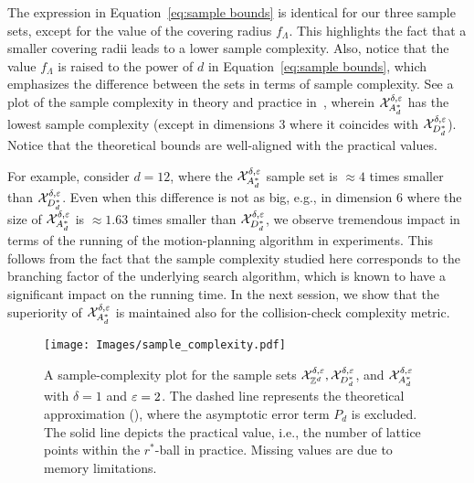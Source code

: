 The expression in Equation~\eqref{eq:sample bounds} is identical for our three sample sets, except for the value of the covering radius $f_\Lambda$. This highlights the fact that a smaller covering radii leads to a lower sample complexity. Also, notice that the value $f_\Lambda$ is raised to the power of $d$ in Equation~\eqref{eq:sample bounds}, which emphasizes the difference between the sets in terms of sample complexity. 
See a plot of the sample complexity in theory and practice in~, wherein $\mathcal{X}_{A_d^*}^{\delta,\varepsilon}$ has the lowest sample complexity (except in dimensions $3$ where it coincides with $\mathcal{X}_{D_d^*}^{\delta,\varepsilon}$). Notice that the theoretical bounds are well-aligned with the practical values. 

For example, consider $d=12$, where the $\mathcal{X}_{A_d^*}^{\delta,\varepsilon}$ sample set is  $\approx 4$ times smaller than $\mathcal{X}_{D_d^*}^{\delta,\varepsilon}$.  Even when this difference is not as big, e.g., in dimension $6$ where the size of $\mathcal{X}_{A_d^*}^{\delta,\varepsilon}$ is  $\approx 1.63$ times smaller than $\mathcal{X}_{D_d^*}^{\delta,\varepsilon}$, we observe tremendous impact in terms of the running of the motion-planning algorithm in experiments. This follows from the fact that the sample complexity studied here corresponds to the branching factor of the underlying search algorithm, which is known to have a significant impact on the running time. In the next session, we show that the superiority of $\mathcal{X}_{A_d^*}^{\delta,\varepsilon}$ is maintained also for the collision-check complexity metric.

\begin{figure}[thb]
\texttt{[image: Images/sample\_complexity.pdf]}
\caption{A sample-complexity  plot for the sample sets $\mathcal{X}_{\mathbb{Z}^d}^{\delta,\varepsilon},\mathcal{X}_{D_d^*}^{\delta,\varepsilon}$, and $\mathcal{X}_{A_d^*}^{\delta,\varepsilon}$ with $\delta=1$ and $\varepsilon=2$. The dashed line represents the theoretical approximation (), where the asymptotic error term $P_d$ is excluded. The solid line depicts the practical value, i.e., the  number of lattice points within the $r^*$-ball in practice. Missing values are due to memory limitations.}
\label{fig:limit_graph_upper}
\end{figure}



